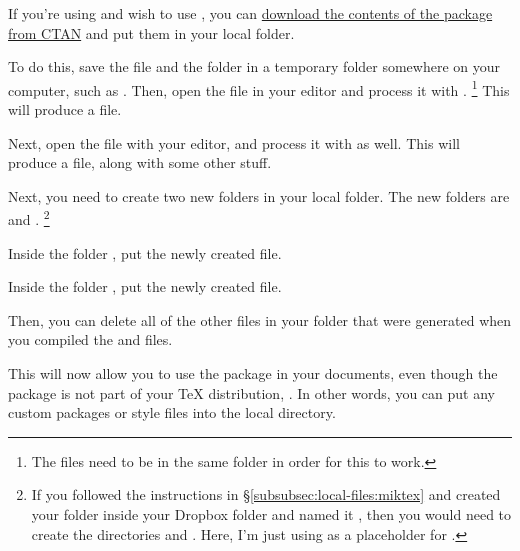 If you're using  and wish to use , you can \href{http://ctan.org/tex-archive/macros/latex/contrib/textglos}{download the contents of the package from CTAN} and put them in your local  folder.

To do this, save the  file and the  folder in a temporary folder somewhere on your computer, such as .
Then, open the  file in your editor and process it with .%
\footnote{%
The files need to be in the same folder in order for this to work.
}
This will produce a  file.

Next, open the  file with your editor, and process it with  as well.
This will produce a  file, along with some other stuff.

Next, you need to create two new folders in your local  folder.
The new folders are  and .%
\footnote{%
If you followed the instructions in \S\ref{subsubsec:local-files:miktex} and created your  folder inside your Dropbox folder and named it , then you would need to create the directories  and .
Here, I'm just using  as a placeholder for .%
}

Inside the folder , put the newly created  file.

Inside the folder , put the newly created  file.

Then, you can delete all of the other  files in your  folder that were generated when you compiled the  and  files.

This will now allow you to use the  package in your  documents, even though the package is not part of your \TeX{} distribution, .
In other words, you can put any custom packages or style files into the local  directory.

